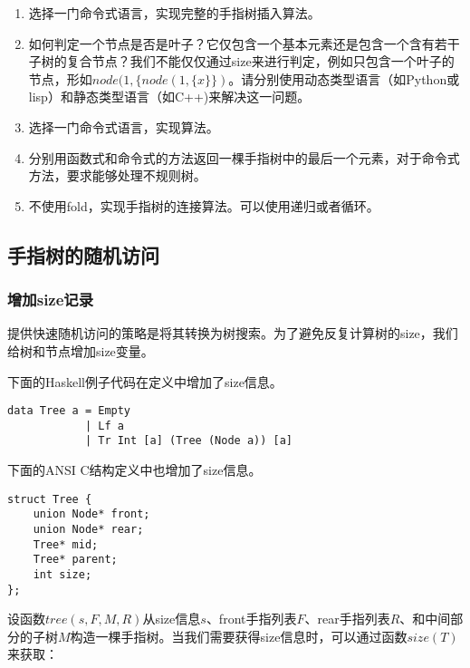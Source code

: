 \documentclass[UTF8]{article}
\begin{document}
\begin{Exercise}
\begin{enumerate}
\item 选择一门命令式语言，实现完整的手指树插入算法。

\item 如何判定一个节点是否是叶子？它仅包含一个基本元素还是包含一个含有若干子树的复合节点？我们不能仅仅通过size来进行判定，例如只包含一个叶子的节点，形如$node(1, \{node(1, \{x\}\})$。请分别使用动态类型语言（如Python或lisp）和静态类型语言（如C++)来解决这一问题。

\item 选择一门命令式语言，实现算法。

\item 分别用函数式和命令式的方法返回一棵手指树中的最后一个元素，对于命令式方法，要求能够处理不规则树。

\item 不使用fold，实现手指树的连接算法。可以使用递归或者循环。
\end{enumerate}
\end{Exercise}

\subsection{手指树的随机访问}

\subsubsection{增加size记录}
提供快速随机访问的策略是将其转换为树搜索。为了避免反复计算树的size，我们给树和节点增加size变量。

下面的Haskell例子代码在定义中增加了size信息。

\lstset{language=Haskell}
\begin{lstlisting}[style=Haskell]
data Tree a = Empty
            | Lf a
            | Tr Int [a] (Tree (Node a)) [a]
\end{lstlisting}

下面的ANSI C结构定义中也增加了size信息。

\lstset{language=C}
\begin{lstlisting}
struct Tree {
    union Node* front;
    union Node* rear;
    Tree* mid;
    Tree* parent;
    int size;
};
\end{lstlisting}

设函数$tree(s, F, M, R)$从size信息$s$、front手指列表$F$、rear手指列表$R$、和中间部分的子树$M$构造一棵手指树。当我们需要获得size信息时，可以通过函数$size(T)$来获取：
\end{document}
